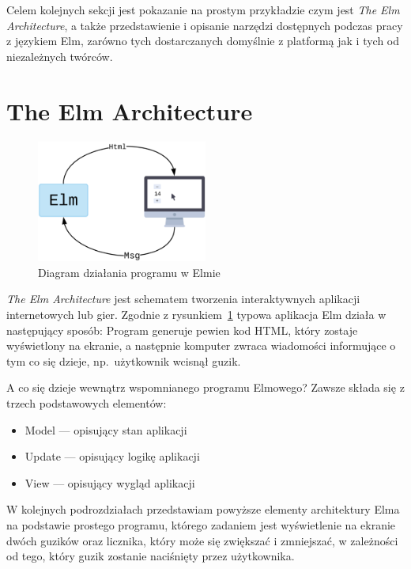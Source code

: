 \documentclass[twoside,a4paper]{report}
\begin{document}
Celem kolejnych sekcji jest pokazanie na prostym przykładzie czym jest \textit{The Elm Architecture}, a także przedstawienie i opisanie narzędzi dostępnych podczas pracy z językiem Elm, zarówno tych dostarczanych domyślnie z platformą jak i tych od niezależnych twórców.

\section{The Elm Architecture}
\begin{figure}[H]
    \centering
    \includegraphics[width=0.5\textwidth]{img/elm_arch.png}
    \caption{Diagram działania programu w Elmie}\label{fig:elm_arch}
\end{figure}

\textit{The Elm Architecture} jest schematem tworzenia interaktywnych aplikacji internetowych lub gier.
Zgodnie z rysunkiem~\ref{fig:elm_arch} typowa aplikacja Elm działa w następujący sposób:
Program generuje pewien kod HTML, który zostaje wyświetlony na ekranie, a następnie komputer zwraca wiadomości informujące o tym co się dzieje, np.~użytkownik wcisnął guzik.

A co się dzieje wewnątrz wspomnianego programu Elmowego? Zawsze składa się z trzech podstawowych elementów:
\begin{itemize}[noitemsep,topsep=0pt]
    \item Model --- opisujący stan aplikacji
    \item Update --- opisujący logikę aplikacji
    \item View --- opisujący wygląd aplikacji
\end{itemize}

W kolejnych podrozdziałach przedstawiam powyższe elementy architektury Elma na podstawie prostego programu, którego zadaniem jest wyświetlenie na ekranie dwóch guzików oraz licznika, który może się zwiększać i zmniejszać, w zależności od tego, który guzik zostanie naciśnięty przez użytkownika.
\end{document}
